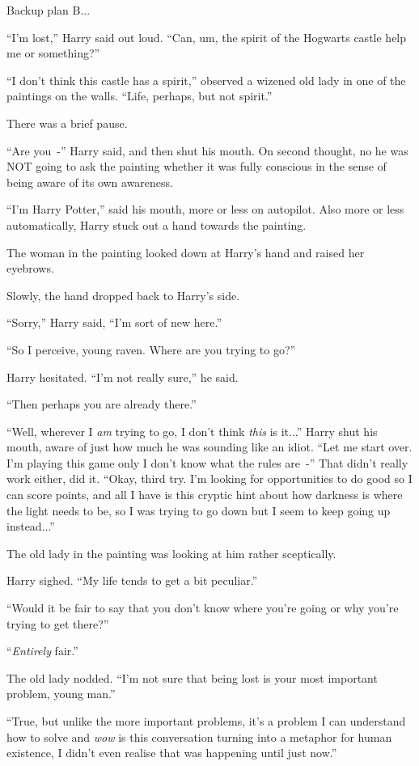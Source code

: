 Backup plan B...

``I'm lost,'' Harry said out loud. ``Can, um, the spirit of the Hogwarts castle help me or something?''

``I don't think this castle has a spirit,'' observed a wizened old lady in one of the paintings on the walls. ``Life, perhaps, but not spirit.''

There was a brief pause.

``Are you~-'' Harry said, and then shut his mouth. On second thought, no he was NOT going to ask the painting whether it was fully conscious in the sense of being aware of its own awareness.

``I'm Harry Potter,'' said his mouth, more or less on autopilot. Also more or less automatically, Harry stuck out a hand towards the painting.

The woman in the painting looked down at Harry's hand and raised her eyebrows.

Slowly, the hand dropped back to Harry's side.

``Sorry,'' Harry said, ``I'm sort of new here.''

``So I perceive, young raven. Where are you trying to go?''

Harry hesitated. ``I'm not really sure,'' he said.

``Then perhaps you are already there.''

``Well, wherever I \emph{am} trying to go, I don't think \emph{this} is it...'' Harry shut his mouth, aware of just how much he was sounding like an idiot. ``Let me start over. I'm playing this game only I don't know what the rules are~-'' That didn't really work either, did it. ``Okay, third try. I'm looking for opportunities to do good so I can score points, and all I have is this cryptic hint about how darkness is where the light needs to be, so I was trying to go down but I seem to keep going up instead...''

The old lady in the painting was looking at him rather sceptically.

Harry sighed. ``My life tends to get a bit peculiar.''

``Would it be fair to say that you don't know where you're going or why you're trying to get there?''

``\emph{Entirely} fair.''

The old lady nodded. ``I'm not sure that being lost is your most important problem, young man.''

``True, but unlike the more important problems, it's a problem I can understand how to solve and \emph{wow} is this conversation turning into a metaphor for human existence, I didn't even realise that was happening until just now.''

